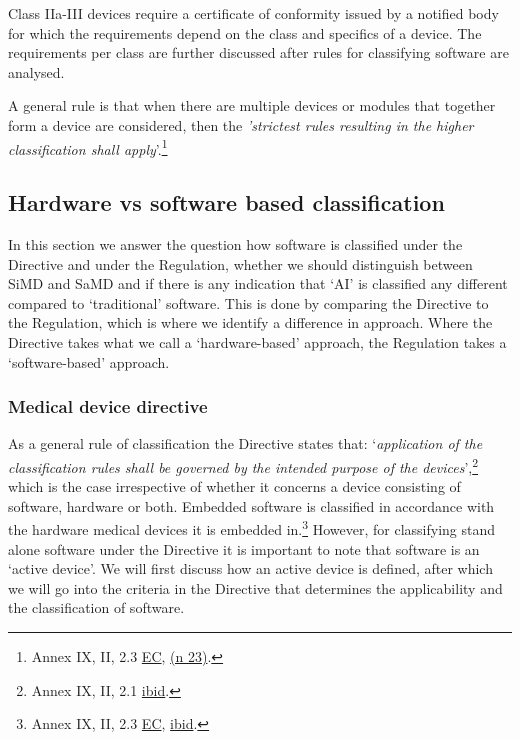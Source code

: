 \documentclass[
]{scrartcl}
\begin{document}
Class IIa-III devices require a certificate of conformity issued by a notified body for which the requirements depend on the class and specifics of a device. The requirements per class are further discussed after rules for classifying software are analysed.

A general rule is that when there are multiple devices or modules that together form a device are considered, then the \emph{'strictest rules resulting in the higher classification shall apply}'.\footnote{Annex IX, II, 2.3 \protect\hyperlink{ref-ecCOUNCILDIRECTIVE931993}{EC}, \protect\hyperlink{ref-ecCOUNCILDIRECTIVE931993}{(n 23)}.}

\hypertarget{hardware-vs-software-based-classification}{%
\subsection{Hardware vs software based classification}\label{hardware-vs-software-based-classification}}

In this section we answer the question how software is classified under the Directive and under the Regulation, whether we should distinguish between SiMD and SaMD and if there is any indication that `AI' is classified any different compared to `traditional' software. This is done by comparing the Directive to the Regulation, which is where we identify a difference in approach. Where the Directive takes what we call a `hardware-based' approach, the Regulation takes a `software-based' approach.

\hypertarget{medical-device-directive}{%
\subsubsection{Medical device directive}\label{medical-device-directive}}

As a general rule of classification the Directive states that: `\emph{application of the classification rules shall be governed by the intended purpose of the devices}',\footnote{Annex IX, II, 2.1 \protect\hyperlink{ref-ecCOUNCILDIRECTIVE931993}{ibid}.} which is the case irrespective of whether it concerns a device consisting of software, hardware or both. Embedded software is classified in accordance with the hardware medical devices it is embedded in.\footnote{Annex IX, II, 2.3 \protect\hyperlink{ref-ecCOUNCILDIRECTIVE931993}{EC}, \protect\hyperlink{ref-ecCOUNCILDIRECTIVE931993}{ibid}.} However, for classifying stand alone software under the Directive it is important to note that software is an `active device'. We will first discuss how an active device is defined, after which we will go into the criteria in the Directive that determines the applicability and the classification of software.
\end{document}
